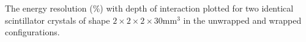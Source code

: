 \label{fig:energyresolution} The energy resolution ($\%$) with depth of interaction plotted for two identical scintillator crystals of shape $2\times2\times2\times30$mm$^3$ in the unwrapped and wrapped configurations.